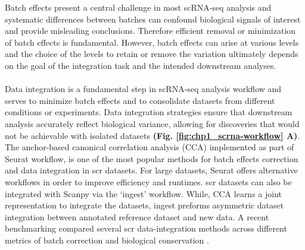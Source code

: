 Batch effects present a central challenge in most scRNA-seq analysis and systematic differences between batches can confound biological signals of interest and provide misleading conclusions. Therefore
efficient removal or minimization of batch effects is fundamental. However, batch effects can arise at various levels and the choice of the levels to retain or remove the variation ultimately depends on the goal of the integration task and the intended downstream analyses.\\\\
Data integration is a fundamental step in scRNA-seq analysis workflow and serves to minimize batch effects and to consolidate datasets from different conditions or experiments. 
Data integration strategies ensure that downstream analysis accurately reflect biological variance, allowing for discoveries that would not be achievable with isolated datasets \textbf{(Fig. \ref{fig:chp1_scrna-workflow} A)}.  %
The anchor-based canonical correlation analysis (CCA) implemented as part of Seurat \textbf{\cite{stuart_comprehensive_2019}} workflow, is one of the most popular methods for batch effects correction and data integration in \gls{scr} datasets. For large datasets, Seurat offers alternative workflows in order to improve efficiency and runtimes. \gls{scr} datasets can also be integrated with Scanpy via the `ingest' workflow. %
While, CCA learns a joint representation to integrate the datasets, ingest preforms asymmetric dataset integration between annotated reference dataset and new data. A recent benchmarking compared several \gls{scr} data-integration methods across different metrics of batch correction and biological conservation \textbf{\cite{luecken_benchmarking_2021}}.\\

